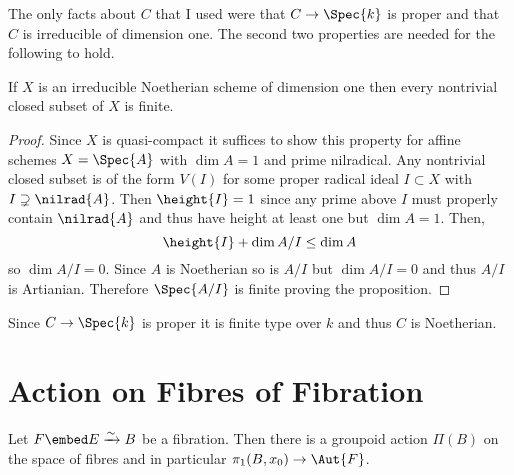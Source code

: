 \documentclass[12pt]{article}
\begin{document}
\begin{remark}
The only facts about $C$ that I used were that $C \to \Spec{k}$ is proper and that $C$ is irreducible of dimension one. The second two properties are needed for the following to hold.
\end{remark}

\begin{lemma}
If $X$ is an irreducible Noetherian scheme of dimension one then every nontrivial closed subset of $X$ is finite.
\end{lemma}

\begin{proof}
Since $X$ is quasi-compact it suffices to show this property for affine schemes $X = \Spec{A}$ with $\dim{A} = 1$ and prime nilradical. Any nontrivial closed subset is of the form $V(I)$ for some proper radical ideal $I \subset X$ with $I \supsetneq \nilrad{A}$. Then $\height{I} = 1$ since any prime above $I$ must properly contain $\nilrad{A}$ and thus have height at least one but $\dim{A} = 1$. Then,
\[ \height{I} + \dim{A / I} \le \dim{A} \]
so $\dim{A / I} = 0$. Since $A$ is Noetherian so is $A / I$ but $\dim{A / I} = 0$ and thus $A / I$ is Artianian. Therefore $\Spec{A / I}$ is finite proving the proposition. 
\end{proof}

\begin{remark}
Since $C \to \Spec{k}$ is proper it is finite type over $k$ and thus $C$ is Noetherian.
\end{remark}

\section{Action on Fibres of Fibration}

\begin{theorem}
Let $F \embed E \xrightarrow{\sim} B$ be a fibration. Then there is a groupoid action $\Pi(B)$ on the space of fibres and in particular $\pi_1(B, x_0) \to \Aut{F}$. 
\end{theorem}
\end{document}
